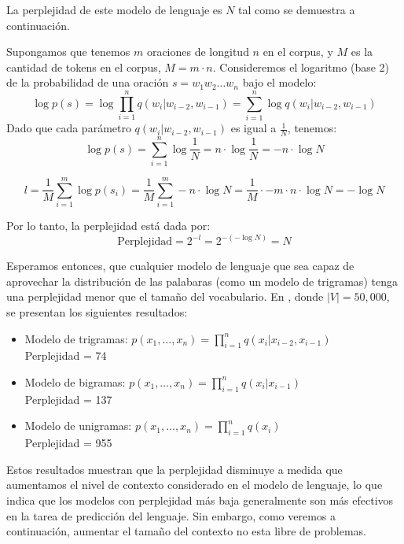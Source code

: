 La perplejidad de este modelo de lenguaje es $N$ tal como se demuestra a continuación.

Supongamos que tenemos $m$ oraciones de longitud $n$ en el corpus, y $M$ es la cantidad de tokens en el corpus, $M = m \cdot n$. Consideremos el logaritmo (base 2) de la probabilidad de una oración $s = w_1 w_2 \dots w_n$ bajo el modelo:
    \[
        \log p(s) = \log \prod_{i=1}^{n} q(w_i|w_{i-2}, w_{i-1}) = \sum_{i=1}^{n} \log q(w_i|w_{i-2}, w_{i-1})
    \]
Dado que cada parámetro $q(w_i|w_{i-2}, w_{i-1})$ es igual a $\frac{1}{N}$, tenemos:
    \[
        \log p(s) = \sum_{i=1}^{n} \log \frac{1}{N} = n \cdot \log \frac{1}{N} = -n \cdot \log N
    \]
    
    
    \[
        l =  \frac{1}{M} \sum_{i=1}^{m} \log p(s_i) = \frac{1}{M} \sum_{i=1}^{m} -n \cdot \log N  = \frac{1}{M} \cdot -m \cdot n \cdot \log N = - \log N 
    \]
    
            
Por lo tanto, la perplejidad está dada por:
    \[
        \text{Perplejidad} = 2^{-l} = 2^{-(- \log N)} = N
    \]

    
Esperamos entonces, que cualquier modelo de lenguaje que sea capaz de aprovechar la distribución de las palabaras (como un modelo de trigramas) tenga una perplejidad menor que el tamaño del vocabulario. En \cite{goodman2001bit}, donde $|V| = 50,000$, se presentan los siguientes resultados:

\begin{itemize}
        \item Modelo de trigramas: $p(x_1, \ldots, x_n) = \prod_{i=1}^n q(x_i | x_{i-2}, x_{i-1})$ \\
        Perplejidad = 74
        \item Modelo de bigramas: $p(x_1, \ldots, x_n) = \prod_{i=1}^n q(x_i | x_{i-1})$ \\
        Perplejidad = 137
        \item Modelo de unigramas: $p(x_1, \ldots, x_n) = \prod_{i=1}^n q(x_i)$ \\
        Perplejidad = 955
    \end{itemize}
    
Estos resultados muestran que la perplejidad disminuye a medida que aumentamos el nivel de contexto considerado en el modelo de lenguaje, lo que indica que los modelos con perplejidad más baja generalmente son más efectivos en la tarea de predicción del lenguaje. Sin embargo, como veremos a continuación, aumentar el tamaño del contexto no esta libre de problemas.   

